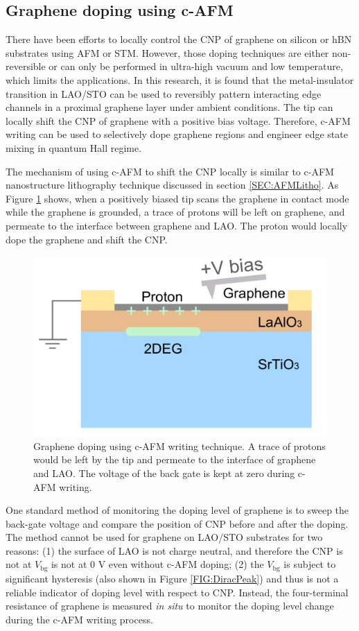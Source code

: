 \documentclass[pdflatex, sectionletters, 12pt, final, phd]{pittetd}    %
\begin{document}
\subsection{Graphene doping using c-AFM}

There have been efforts to locally control the CNP of graphene on silicon or hBN substrates using AFM\cite{schmidt2013mixing} or STM\cite{velasco2016nanoscale}. However, those doping techniques are either non-reversible or can only be performed in ultra-high vacuum and low temperature, which limits the applications. In this research, it is found that the metal-insulator transition in LAO/STO can be used to reversibly pattern interacting edge channels in a proximal graphene layer under ambient conditions. The tip can locally shift the CNP of graphene with a positive bias voltage. Therefore, c-AFM writing can be used to selectively dope graphene regions and engineer edge state mixing in quantum Hall regime.

The mechanism of using c-AFM to shift the CNP locally is similar to c-AFM nanostructure lithography technique discussed in section \ref{SEC:AFMLitho}. As Figure \ref{FIG:GrapheneAFM} shows, when a positively biased tip scans the graphene in contact mode while the graphene is grounded, a trace of protons will be left on graphene, and permeate\cite{hu2014proton} to the interface between graphene and LAO. The proton would locally dope the graphene and shift the CNP. 

\begin{figure}[h!]
	\centering
	\vspace{0.85cm}
	\includegraphics[width=.45\textwidth]{Drawing/GrapheneAFM.pdf}
	\caption[Graphene doping using c-AFM writing technique]{Graphene doping using c-AFM writing technique. A trace of protons would be left by the tip and permeate to the interface of graphene and LAO. The voltage of the back gate is kept at zero during c-AFM writing.}
	\label{FIG:GrapheneAFM}
\end{figure}

One standard method of monitoring the doping level of graphene is to sweep the back-gate voltage and compare the position of CNP before and after the doping. The method cannot be used for graphene on LAO/STO substrates for two reasons: (1) the surface of LAO is not charge neutral, and therefore the CNP is not at $V_\mathrm{bg}$ is not at 0 V even without c-AFM doping; (2) the $V_\mathrm{bg}$ is subject to significant hysteresis\cite{couto2011transport, jnawali2017room} (also shown in Figure \ref{FIG:DiracPeak}) and thus is not a reliable indicator of doping level with respect to CNP. Instead, the four-terminal resistance of graphene is measured \emph{in situ} to monitor the doping level change during the c-AFM writing process. 
\end{document}
